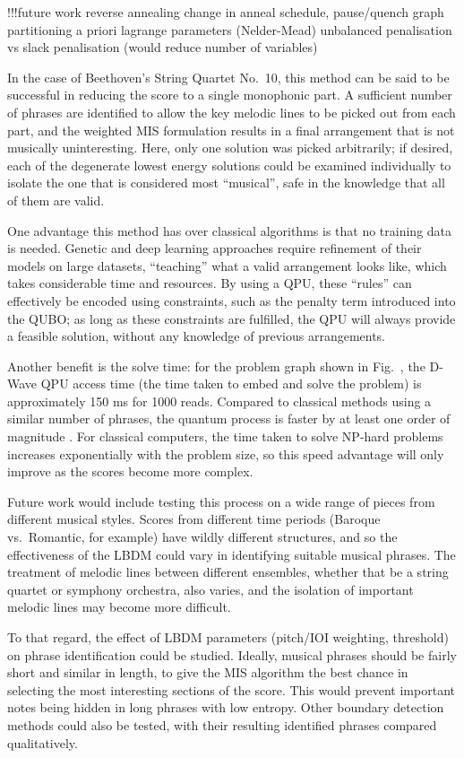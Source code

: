 \documentclass[12pt]{article}
\theoremstyle{definition}
\begin{document}
!!!future work
reverse annealing
change in anneal schedule, pause/quench
graph partitioning
a priori lagrange parameters (Nelder-Mead)
unbalanced penalisation vs slack penalisation (would reduce number of variables)


In the case of Beethoven's String Quartet No.\ 10, this method can be said to be successful in reducing the score to a single monophonic part. A sufficient number of phrases are identified to allow the key melodic lines to be picked out from each part, and the weighted MIS formulation results in a final arrangement that is not musically uninteresting. Here, only one solution was picked arbitrarily; if desired, each of the degenerate lowest energy solutions could be examined individually to isolate the one that is considered most ``musical'', safe in the knowledge that all of them are valid.

One advantage this method has over classical algorithms is that no training data is needed. Genetic and deep learning approaches require refinement of their models on large datasets, ``teaching'' what a valid arrangement looks like, which takes considerable time and resources. By using a QPU, these ``rules'' can effectively be encoded using constraints, such as the penalty term introduced into the QUBO; as long as these constraints are fulfilled, the QPU will always provide a feasible solution, without any knowledge of previous arrangements.

Another benefit is the solve time: for the problem graph shown in Fig.\  , the D-Wave QPU access time (the time taken to embed and solve the problem) is approximately 150 ms for 1000 reads. Compared to classical methods using a similar number of phrases, the quantum process is faster by at least one order of magnitude . For classical computers, the time taken to solve NP-hard problems increases exponentially with the problem size, so this speed advantage will only improve as the scores become more complex.

Future work would include testing this process on a wide range of pieces from different musical styles. Scores from different time periods (Baroque vs.\ Romantic, for example) have wildly different structures, and so the effectiveness of the LBDM could vary in identifying suitable musical phrases. The treatment of melodic lines between different ensembles, whether that be a string quartet or symphony orchestra, also varies, and the isolation of important melodic lines may become more difficult.

To that regard, the effect of LBDM parameters (pitch/IOI weighting, threshold) on phrase identification could be studied. Ideally, musical phrases should be fairly short and similar in length, to give the MIS algorithm the best chance in selecting the most interesting sections of the score. This would prevent important notes being hidden in long phrases with low entropy. Other boundary detection methods could also be tested, with their resulting identified phrases compared qualitatively.
\end{document}
